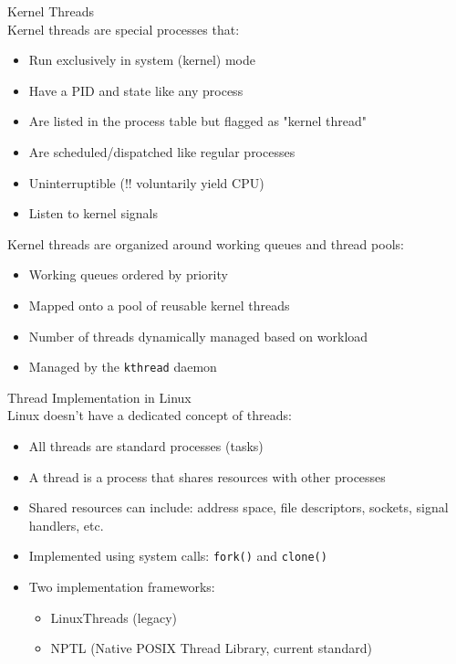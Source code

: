 \begin{definition}{Kernel Threads}\\
    Kernel threads are special processes that:
    \begin{itemize}
        \item Run exclusively in system (kernel) mode
        \item Have a PID and state like any process
        \item Are listed in the process table but flagged as "kernel thread"
        \item Are scheduled/dispatched like regular processes
        \item Uninterruptible (!! voluntarily yield CPU)
        \item Listen to kernel signals
    \end{itemize}
    
    Kernel threads are organized around working queues and thread pools:
    \begin{itemize}
        \item Working queues ordered by priority
        \item Mapped onto a pool of reusable kernel threads
        \item Number of threads dynamically managed based on workload
        \item Managed by the \texttt{kthread} daemon
    \end{itemize}
\end{definition}

\begin{concept}{Thread Implementation in Linux}\\
    Linux doesn't have a dedicated concept of threads:
    \begin{itemize}
        \item All threads are standard processes (tasks)
        \item A thread is a process that shares resources with other processes
        \item Shared resources can include: address space, file descriptors, sockets, signal handlers, etc.
        \item Implemented using system calls: \texttt{fork()} and \texttt{clone()}
        \item Two implementation frameworks:
            \begin{itemize}
                \item LinuxThreads (legacy)
                \item NPTL (Native POSIX Thread Library, current standard)
            \end{itemize}
    \end{itemize}
\end{concept}


